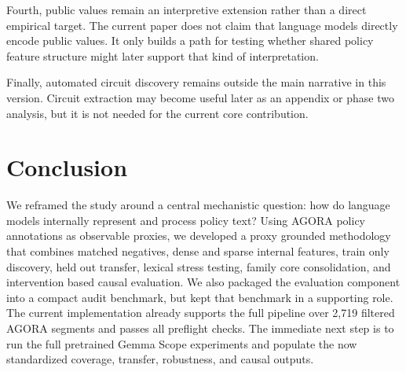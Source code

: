 ﻿\documentclass{article}
\begin{document}
Fourth, public values remain an interpretive extension rather than a direct empirical target. The current paper does not claim that language models directly encode public values. It only builds a path for testing whether shared policy feature structure might later support that kind of interpretation.

Finally, automated circuit discovery remains outside the main narrative in this version. Circuit extraction may become useful later as an appendix or phase two analysis, but it is not needed for the current core contribution.

\section{Conclusion}
We reframed the study around a central mechanistic question: how do language models internally represent and process policy text? Using AGORA policy annotations as observable proxies, we developed a proxy grounded methodology that combines matched negatives, dense and sparse internal features, train only discovery, held out transfer, lexical stress testing, family core consolidation, and intervention based causal evaluation. We also packaged the evaluation component into a compact audit benchmark, but kept that benchmark in a supporting role. The current implementation already supports the full pipeline over 2,719 filtered AGORA segments and passes all preflight checks. The immediate next step is to run the full pretrained Gemma Scope experiments and populate the now standardized coverage, transfer, robustness, and causal outputs.


\end{document}
